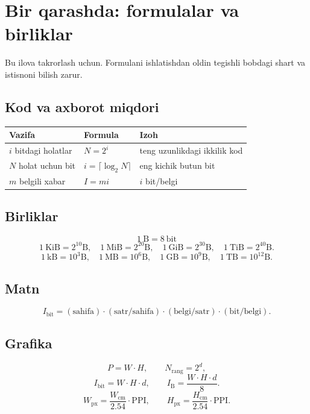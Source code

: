 \documentclass[11pt,a4paper,oneside]{book}
\newcommand{\B}{\mathrm{B}}
\newcommand{\bit}{\mathrm{bit}}
\newcommand{\chapterintro}[1]{\begin{tcolorbox}[colback=Navy,coltext=white,arc=2mm,boxrule=0pt]\sffamily #1\end{tcolorbox}}
\begin{document}
\chapter{Bir qarashda: formulalar va birliklar}
\chapterintro{Bu ilova takrorlash uchun. Formulani ishlatishdan oldin
tegishli bobdagi shart va istisnoni bilish zarur.}

\section{Kod va axborot miqdori}

\begin{tabularx}{\textwidth}{@{}L{48mm}L{55mm}Y@{}}
\toprule
\textbf{Vazifa} & \textbf{Formula} & \textbf{Izoh}\\
\midrule
\(i\) bitdagi holatlar & \(N=2^i\) & teng uzunlikdagi ikkilik kod\\
\(N\) holat uchun bit & \(i=\lceil\log_2N\rceil\) & eng kichik butun bit\\
\(m\) belgili xabar & \(I=mi\) & \(i\) bit/belgi\\
\bottomrule
\end{tabularx}

\section{Birliklar}

\[
1~\B=8~\bit
\]
\[
1~\mathrm{KiB}=2^{10}\B,\quad
1~\mathrm{MiB}=2^{20}\B,\quad
1~\mathrm{GiB}=2^{30}\B,\quad
1~\mathrm{TiB}=2^{40}\B.
\]
\[
1~\mathrm{kB}=10^3\B,\quad
1~\mathrm{MB}=10^6\B,\quad
1~\mathrm{GB}=10^9\B,\quad
1~\mathrm{TB}=10^{12}\B.
\]

\section{Matn}

\[
I_{\bit}=(\text{sahifa})\cdot(\text{satr/sahifa})
\cdot(\text{belgi/satr})\cdot(\text{bit/belgi}).
\]

\section{Grafika}

\[
P=W\cdot H,\qquad N_{\text{rang}}=2^d,
\]
\[
I_{\bit}=W\cdot H\cdot d,\qquad
I_{\B}=\frac{W\cdot H\cdot d}{8}.
\]
\[
W_{\mathrm{px}}=\frac{W_{\mathrm{cm}}}{2.54}\cdot\mathrm{PPI},
\qquad
H_{\mathrm{px}}=\frac{H_{\mathrm{cm}}}{2.54}\cdot\mathrm{PPI}.
\]
\end{document}

